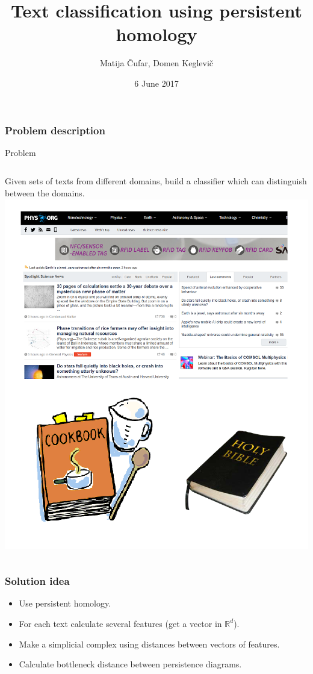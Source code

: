 \documentclass[unknownkeysallowed]{beamer}
\title[Text Analysis]{Text classification using persistent homology} %
\author{Matija Čufar, Domen Keglevič} %
\institute[] %
{
Faculty of Computer and Information Science \\ %
\medskip
}
\date{6 June 2017} %
\def\R{\mathbb R}
\begin{document}
\begin{frame}
\titlepage %
\end{frame}

\begin{frame}
\frametitle{Problem description} 
\begin{block}{Problem}
\begin{columns}[c]
	Given sets of texts from different domains, build a classifier which can distinguish between the domains.
	\includegraphics[width=0.9\linewidth]{different_domains}
\end{columns}
\end{block}
\end{frame}

\begin{frame}
\frametitle{Solution idea}
\begin{itemize}
\item Use persistent homology.
\bigskip
\item For each text calculate several features (get a vector in $\R ^d$).
\bigskip
\item Make a simplicial complex using distances between vectors of features.
\bigskip
\item Calculate bottleneck distance between persistence diagrams.
\end{itemize}
\end{frame}
\end{document}
